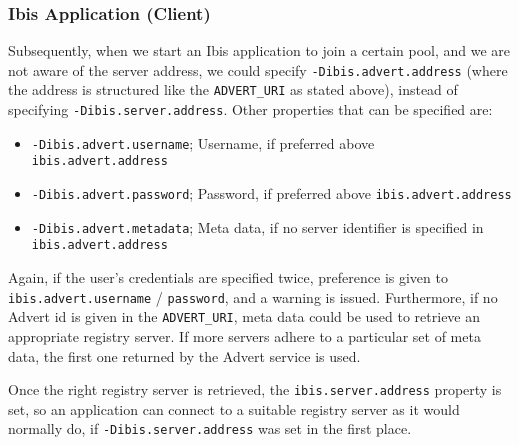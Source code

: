 \subsubsection{Ibis Application (Client)}
Subsequently, when we start an Ibis application to join a certain pool, and we
are not aware of the server address, we could specify
\texttt{-Dibis.advert.address} (where the address is structured like the
\texttt{ADVERT\_URI} as stated above), instead of specifying
\texttt{-Dibis.server.address}. Other properties that can be specified are:

\begin{itemize}
  \item \texttt{-Dibis.advert.username}; Username, if preferred above
  	\texttt{ibis.advert.address}
  \item \texttt{-Dibis.advert.password}; Password, if preferred above
  	\texttt{ibis.advert.address} 
  \item \texttt{-Dibis.advert.metadata}; Meta data, if no server identifier is
  	specified in \newline \texttt{ibis.advert.address}
\end{itemize}

Again, if the user's credentials are specified twice, preference is given to
\texttt{ibis.advert.username} / \texttt{password}, and a warning is issued.
Furthermore, if no Advert id is given in the \texttt{ADVERT\_URI}, meta data
could be used to retrieve an appropriate registry server. If more servers
adhere to a particular set of meta data, the first one returned by the Advert
service is used.

Once the right registry server is retrieved, the \texttt{ibis.server.address}
property is set, so an application can connect to a suitable registry server as
it would normally do, if \texttt{-Dibis.server.address} was set in the first
place.

